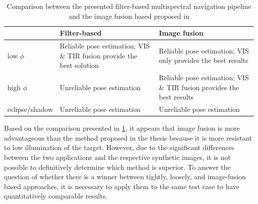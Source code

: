 \begin{table}[!h]
    \centering
    \begin{tabular}{l p{6cm} p{6cm}}
         & Filter-based & Image fusion \\\hline\hline
       low $\phi$  & Reliable pose estimation; VIS \& TIR fusion provide the best solution & Reliable pose estimation; VIS only provides the best results \\\hline 
       high $\phi$  & Unreliable pose estimation & Reliable pose estimation; VIS \& TIR fusion provides the best results \\\hline 
       eclipse/shadow  & Unreliable pose estimation & Unreliable pose estimation \\\hline 
    \end{tabular}
    \caption{Comparison between the presented filter-based multispectral navigation pipeline and the image fusion based proposed in \cite{piccinin2023spacecraft}}
    \label{tab:compa}
\end{table}
Based on the comparison presented in \cref{tab:compa}, it appears that image fusion is more advantageous than the method proposed in the thesis because it is more resistant to low illumination of the target. However, due to the significant differences between the two applications and the respective synthetic images, it is not possible to definitively determine which method is superior. To answer the question of whether there is a winner between tightly, loosely, and image-fusion based approaches, it is necessary to apply them to the same test case to have quantitatively comparable results.



